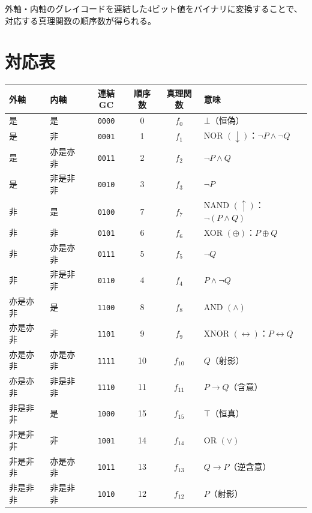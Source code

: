 \documentclass[11pt,a4paper]{article}
\theoremstyle{definition}
\begin{document}
外軸・内軸のグレイコードを連結した4ビット値をバイナリに変換することで、
対応する真理関数の順序数が得られる。

\section{対応表}

\renewcommand{\arraystretch}{1.25}
\begin{center}
\begin{tabular}{llcccp{4.5cm}}
\toprule
外軸 & 内軸 & 連結GC & 順序数 & 真理関数 & 意味 \\
\midrule
\rowcolor{gray!10}
是 & 是     & \texttt{0000} & 0  & $f_0$  & $\bot$（恒偽） \\
是 & 非     & \texttt{0001} & 1  & $f_1$  & NOR $(\downarrow)$：$\neg P \wedge \neg Q$ \\
\rowcolor{gray!10}
是 & 亦是亦非 & \texttt{0011} & 2  & $f_2$  & $\neg P \wedge Q$ \\
是 & 非是非非 & \texttt{0010} & 3  & $f_3$  & $\neg P$ \\
\midrule
\rowcolor{gray!10}
非 & 是     & \texttt{0100} & 7  & $f_7$  & NAND $(\uparrow)$：$\neg(P \wedge Q)$ \\
非 & 非     & \texttt{0101} & 6  & $f_6$  & XOR $(\oplus)$：$P \oplus Q$ \\
\rowcolor{gray!10}
非 & 亦是亦非 & \texttt{0111} & 5  & $f_5$  & $\neg Q$ \\
非 & 非是非非 & \texttt{0110} & 4  & $f_4$  & $P \wedge \neg Q$ \\
\midrule
\rowcolor{gray!10}
亦是亦非 & 是     & \texttt{1100} & 8  & $f_8$  & AND $(\wedge)$ \\
亦是亦非 & 非     & \texttt{1101} & 9  & $f_9$  & XNOR $(\leftrightarrow)$：$P \leftrightarrow Q$ \\
\rowcolor{gray!10}
亦是亦非 & 亦是亦非 & \texttt{1111} & 10 & $f_{10}$ & $Q$（射影） \\
亦是亦非 & 非是非非 & \texttt{1110} & 11 & $f_{11}$ & $P \to Q$（含意） \\
\midrule
\rowcolor{gray!10}
非是非非 & 是     & \texttt{1000} & 15 & $f_{15}$ & $\top$（恒真） \\
非是非非 & 非     & \texttt{1001} & 14 & $f_{14}$ & OR $(\vee)$ \\
\rowcolor{gray!10}
非是非非 & 亦是亦非 & \texttt{1011} & 13 & $f_{13}$ & $Q \to P$（逆含意） \\
非是非非 & 非是非非 & \texttt{1010} & 12 & $f_{12}$ & $P$（射影） \\
\bottomrule
\end{tabular}
\end{center}
\end{document}
